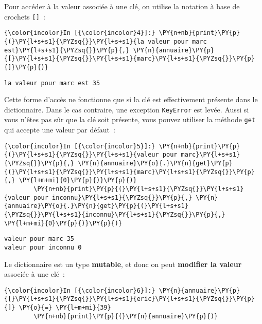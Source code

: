     Pour accéder à la valeur associée à une clé, on utilise la notation à
base de crochets \texttt{{[}{]}}~:

    \begin{Verbatim}[commandchars=\\\{\}]
{\color{incolor}In [{\color{incolor}4}]:} \PY{n+nb}{print}\PY{p}{(}\PY{l+s+s1}{\PYZsq{}}\PY{l+s+s1}{la valeur pour marc est}\PY{l+s+s1}{\PYZsq{}}\PY{p}{,} \PY{n}{annuaire}\PY{p}{[}\PY{l+s+s1}{\PYZsq{}}\PY{l+s+s1}{marc}\PY{l+s+s1}{\PYZsq{}}\PY{p}{]}\PY{p}{)}
\end{Verbatim}


    \begin{Verbatim}[commandchars=\\\{\}]
la valeur pour marc est 35

    \end{Verbatim}

    Cette forme d'accès ne fonctionne que si la clé est effectivement
présente dans le dictionnaire. Dans le cas contraire, une exception
\texttt{KeyError} est levée. Aussi si vous n'êtes pas sûr que la clé
soit présente, vous pouvez utiliser la méthode \texttt{get} qui accepte
une valeur par défaut~:

    \begin{Verbatim}[commandchars=\\\{\}]
{\color{incolor}In [{\color{incolor}5}]:} \PY{n+nb}{print}\PY{p}{(}\PY{l+s+s1}{\PYZsq{}}\PY{l+s+s1}{valeur pour marc}\PY{l+s+s1}{\PYZsq{}}\PY{p}{,} \PY{n}{annuaire}\PY{o}{.}\PY{n}{get}\PY{p}{(}\PY{l+s+s1}{\PYZsq{}}\PY{l+s+s1}{marc}\PY{l+s+s1}{\PYZsq{}}\PY{p}{,} \PY{l+m+mi}{0}\PY{p}{)}\PY{p}{)}
        \PY{n+nb}{print}\PY{p}{(}\PY{l+s+s1}{\PYZsq{}}\PY{l+s+s1}{valeur pour inconnu}\PY{l+s+s1}{\PYZsq{}}\PY{p}{,} \PY{n}{annuaire}\PY{o}{.}\PY{n}{get}\PY{p}{(}\PY{l+s+s1}{\PYZsq{}}\PY{l+s+s1}{inconnu}\PY{l+s+s1}{\PYZsq{}}\PY{p}{,} \PY{l+m+mi}{0}\PY{p}{)}\PY{p}{)}
\end{Verbatim}


    \begin{Verbatim}[commandchars=\\\{\}]
valeur pour marc 35
valeur pour inconnu 0

    \end{Verbatim}

    Le dictionnaire est un type \textbf{mutable}, et donc on peut
\textbf{modifier la valeur} associée à une clé~:

    \begin{Verbatim}[commandchars=\\\{\}]
{\color{incolor}In [{\color{incolor}6}]:} \PY{n}{annuaire}\PY{p}{[}\PY{l+s+s1}{\PYZsq{}}\PY{l+s+s1}{eric}\PY{l+s+s1}{\PYZsq{}}\PY{p}{]} \PY{o}{=} \PY{l+m+mi}{39}
        \PY{n+nb}{print}\PY{p}{(}\PY{n}{annuaire}\PY{p}{)}
\end{Verbatim}


